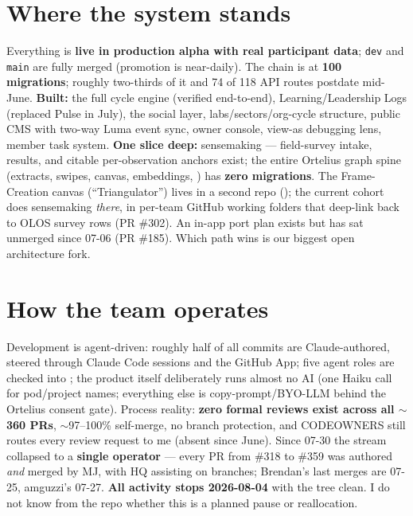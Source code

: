 \documentclass[10pt]{article}
\newcommand{\gh}[1]{\mbox{\##1}}
\begin{document}
\section{Where the system stands}
Everything is \textbf{live in production alpha with real participant data}; \texttt{dev} and \texttt{main} are fully merged (promotion is near-daily). The chain is at \textbf{100 migrations}; roughly two-thirds of it and 74 of 118 API routes postdate mid-June. \textbf{Built:} the full cycle engine (verified end-to-end), Learning/Leadership Logs (replaced Pulse in July), the social layer, labs/sectors/org-cycle structure, public CMS with two-way Luma event sync, owner console, view-as debugging lens, member task system. \textbf{One slice deep:} sensemaking --- field-survey intake, results, and citable per-observation anchors exist; the entire Ortelius graph spine (extracts, swipes, canvas, embeddings, ) has \textbf{zero migrations}. The Frame-Creation canvas (``Triangulator'') lives in a second repo (); the current cohort does sensemaking \emph{there}, in per-team GitHub working folders that deep-link back to OLOS survey rows (PR \gh{302}). An in-app port plan exists but has sat unmerged since 07-06 (PR \gh{185}). Which path wins is our biggest open architecture fork.

\section{How the team operates}
Development is agent-driven: roughly half of all commits are Claude-authored, steered through Claude Code sessions and the GitHub App; five agent roles are checked into ; the product itself deliberately runs almost no AI (one Haiku call for pod/project names; everything else is copy-prompt/BYO-LLM behind the Ortelius consent gate). Process reality: \textbf{zero formal reviews exist across all $\sim$360 PRs}, $\sim$97--100\% self-merge, no branch protection, and CODEOWNERS still routes every review request to me (absent since June). Since 07-30 the stream collapsed to a \textbf{single operator} --- every PR from \gh{318} to \gh{359} was authored \emph{and} merged by MJ, with HQ assisting on branches; Brendan's last merges are 07-25, amguzzi's 07-27. \textbf{All activity stops 2026-08-04} with the tree clean. I do not know from the repo whether this is a planned pause or reallocation.
\end{document}
